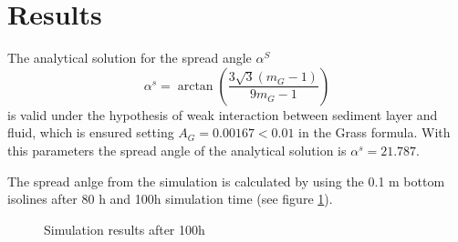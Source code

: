 %
\section{Results}
%
The analytical solution for the spread angle $\alpha^S$
\begin{equation}
\alpha^s = \arctan (\frac{3\sqrt{3}(m_G-1)}{9m_G-1})
\end{equation}
is valid under the hypothesis of weak interaction between sediment layer
and fluid, which is ensured setting $A_G=0.00167 < 0.01$ in the Grass formula.
With this parameters the spread angle of the analytical solution is $\alpha^s=21.787$.

The spread anlge from the simulation is calculated by using the
0.1 m  bottom isolines after 80 h and 100h simulation time (see figure \ref{gai_bump-t2d}).


\begin{figure} [!ht]
\centering
{}
 \caption{Simulation results after 100h}\label{gai_bump-t2d}
\end{figure}


